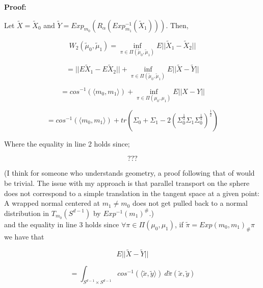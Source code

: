 \documentclass[]{article}
\begin{document}
%


\textbf{Proof:}

Let $\tilde{X} = \tilde{X}_0$ and $\tilde{Y} = Exp_{m_0}(R_\alpha(Exp_{m_1}^{-1}(\tilde{X}_1)))$. Then,

\begin{equation*}
	W_2(\tilde{\mu}_0, \tilde{\mu}_1) =  \inf_{\pi \in \Pi(\tilde{\mu}_0, \tilde{\mu}_1)} E||\tilde{X}_1-\tilde{X}_2||  
\end{equation*}  

\begin{equation}
	 =  ||E\tilde{X}_1 - E\tilde{X}_2|| + \inf_{\pi \in \Pi(\tilde{\mu}_0, \tilde{\mu}_1)} E||\tilde{X} - \tilde{Y}||  
\end{equation}

\begin{equation}
	= cos^{-1}( \langle m_0, m_1 \rangle ) +\inf_{\pi \in \Pi({\mu}_0, {\mu}_1)} E||X-Y||
\end{equation} 

\begin{equation*}
	= cos^{-1}( \langle m_0, m_1 \rangle ) + tr(\Sigma_0 + \Sigma_1 - 2(\Sigma_0^{\frac{1}{2}}\Sigma_1\Sigma_0^{\frac{1}{2}})^{\frac{1}{2}})
\end{equation*} 

\newpage
Where the equality in line 2 holds since;

\begin{equation*}
	???
\end{equation*}

(I think for someone who understands geometry, a proof following that of \cite{https://doi.org/10.48550/arxiv.0801.2250} would be trivial. The issue with my approach is that parallel transport on the sphere does not correspond to a simple translation in the tangent space at a given point: A wrapped normal centered at $m_1 \neq m_0$ does not get pulled back to a normal distribution in $T_{m_0}(S^{d-1})$ by $Exp^{-1}(m_1)^{\#}$.)\\

and the equality in line 3 holds since $\forall \pi \in \Pi(\mu_0, \mu_1)$, if $\tilde{\pi} = {Exp(m_0,m_1)}_\# \pi$ we have that 

\begin{equation*}
	E||\tilde{X}-\tilde{Y}||  
\end{equation*}  

\begin{equation*}
	= \int_{S^{d-1}\times S^{d-1}} cos^{-1}(\langle \tilde{x}, \tilde{y} \rangle) \ d\tilde{\pi}(\tilde{x},\tilde{y})
\end{equation*}
\end{document}
